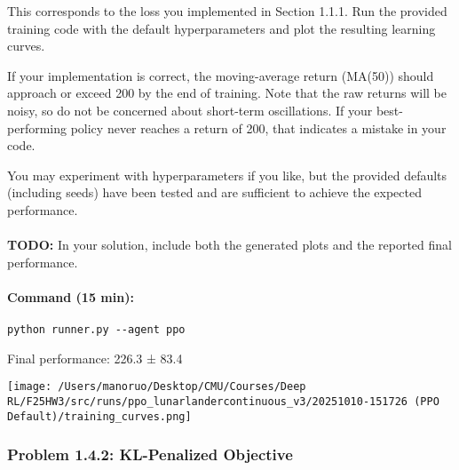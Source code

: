 \documentclass[12pt]{article}
\begin{document}
This corresponds to the loss you implemented in Section 1.1.1. Run the provided training code with the default hyperparameters and plot the resulting learning curves.  

If your implementation is correct, the moving-average return (MA(50)) should approach or exceed 200 by the end of training. Note that the raw returns will be noisy, so do not be concerned about short-term oscillations. If your best-performing policy never reaches a return of 200, that indicates a mistake in your code.  

You may experiment with hyperparameters if you like, but the provided defaults (including seeds) have been tested and are sufficient to achieve the expected performance.\\
\\
\noindent
\textbf{TODO:} In your solution, include both the generated plots and the reported final performance.

\paragraph{Command (15 min):}
\begin{verbatim}
python runner.py --agent ppo
\end{verbatim}


\begin{solution}[height=10cm]
Final performance: 226.3 ± 83.4

 \centering
    \texttt{[image: /Users/manoruo/Desktop/CMU/Courses/Deep RL/F25HW3/src/runs/ppo\_lunarlandercontinuous\_v3/20251010-151726 (PPO Default)/training\_curves.png]}
    \label{fig:ppo_basic}
\end{solution}

\subsubsection*{Problem 1.4.2: KL-Penalized Objective}
\end{document}
